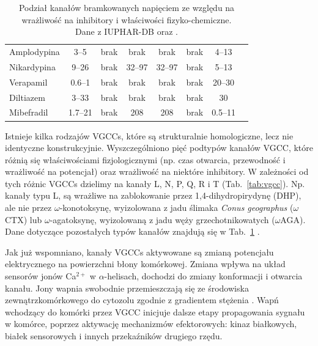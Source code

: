 \begin{landscape}
\begin{table}
\begin{tabular}{lccccccr}
Amplodypina         & 3--5    & brak & brak  & brak  & brak & 4--13  & \cite{Furukawa2009,Kwan1995} \\
Nikardypina         & 9--26   & brak & 32--97 & 32--97 & brak & 5--13  & \cite{Furukawa1999} \\
Verapamil          & 0.6--1   & brak & brak  & brak  & brak & 20--30 & \cite{Catterall2005,Freeze2006} \\
Diltiazem          & 3--33   & brak & brak  & brak  & brak & 30   & \cite{Catterall2005} \\
Mibefradil         & 1.7--21  & brak & 208  & 208  & brak & 0.5--11 & \cite{Aczel1998,Xi2001} \\\bottomrule[0.12em]
\end{tabular}
\caption [Podsumowanie właściwości VGCC]{Podział kanałów bramkowanych napięciem ze względu na wrażliwość na inhibitory i właściwości fizyko-chemiczne. \\Dane z IUPHAR-DB oraz \cite{Gurkoff2013,Simms2014}.}
\label{tab:vgccprop}
\end{table}
\end{landscape}

Istnieje kilka rodzajów VGCCs, które są strukturalnie homologiczne, lecz nie identyczne konstrukcyjnie. Wyszczególniono pięć podtypów kanałów VGCC, które różnią się właściwościami fizjologicznymi (np. czas otwarcia, przewodność i wrażliwość na potencjał) oraz wrażliwość na niektóre inhibitory. W zależności od tych różnic VGCCs dzielimy na kanały L, N, P, Q, R i T (Tab.~\ref{tab:vgcc}). Np. kanały typu L, są wrażliwe na zablokowanie przez 1,4-dihydropirydynę (DHP), ale nie przez $\omega$-konotoksynę, wyizolowana z jadu ślimaka \emph{Conus geographus} ($\omega$CTX) lub $\omega$-agatoksynę, wyizolowaną z jadu węży grzechotnikowatych ($\omega$AGA). Dane dotyczące pozostałych typów kanałów znajdują się w Tab.~\ref{tab:vgccprop} \cite{Gurkoff2013,Simms2014}.

Jak już wspomniano, kanały VGCCs aktywowane są zmianą potencjału elektrycznego na powierzchni błony komórkowej. Zmiana wpływa na układ sensorów jonów Ca$^{2+}$ w $\alpha$-helisach, dochodzi do zmiany konformacji i otwarcia kanału. Jony wapnia swobodnie przemieszczają się ze środowiska zewnątrzkomórkowego do cytozolu zgodnie z gradientem stężenia \cite{Lacinova2005}. Wapń wchodzący do komórki przez VGCC inicjuje dalsze etapy propagowania sygnału w komórce, poprzez aktywację mechanizmów efektorowych: kinaz białkowych, białek sensorowych i innych przekaźników drugiego rzędu.

